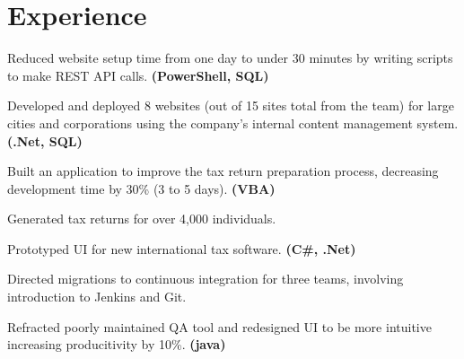 \documentclass[letterpaper]{kevin-resume} %
\begin{document}
\begin{minipage}[t]{0.63\textwidth} %


\section{Experience}

\vspace{\topsep} %
\begin{tightitemize}
	\item Reduced website setup time from one day to under 30 minutes by writing scripts to make REST API calls. \textbf{(PowerShell, SQL)}
	\item Developed and deployed 8 websites (out of 15 sites total from the team) for large cities and corporations using the company's internal content management system. \textbf{(.Net, SQL)}
\end{tightitemize}

\sectionspace %


\begin{tightitemize}
	\item Built an application to improve the tax return preparation process, decreasing development time by 30\% (3 to 5 days). \textbf{(VBA)}
	\item Generated tax returns for over 4,000 individuals.
	\item Prototyped UI for new international tax software. \textbf{(C\#, .Net)}
\end{tightitemize}

\sectionspace %


\begin{tightitemize}
	\item Directed migrations to continuous integration for three teams, involving introduction to Jenkins and Git.
	\item Refracted poorly maintained QA tool and redesigned UI to be more intuitive increasing producitivity by 10\%. \textbf{(java)}
\end{tightitemize}


\end{minipage}
\end{document}
